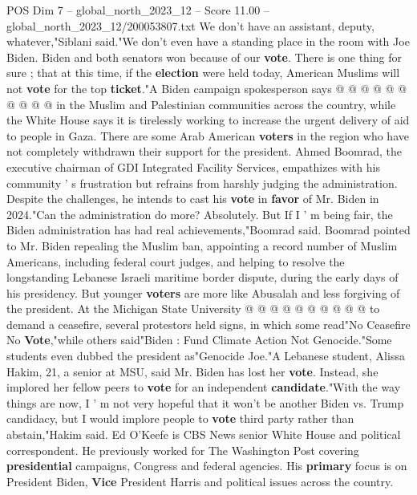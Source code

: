 \begin{textsample}{POS Dim 7 – global\_north\_2023\_12 – Score 11.00 – global\_north\_2023\_12/200053807.txt}
We don't have an assistant, deputy, whatever,"Siblani said."We don't even have a standing place in the room with Joe Biden.
Biden and both senators won because of our \textbf{vote}.
There is one thing for sure ; that at this time, if the \textbf{election} were held today, American Muslims will not \textbf{vote} for the top \textbf{ticket}."A Biden campaign spokesperson says @ @ @ @ @ @ @ @ @ @ in the Muslim and Palestinian communities across the country, while the White House says it is tirelessly working to increase the urgent delivery of aid to people in Gaza.
There are some Arab American \textbf{voters} in the region who have not completely withdrawn their support for the president.
Ahmed Boomrad, the executive chairman of GDI Integrated Facility Services, empathizes with his community ' s frustration but refrains from harshly judging the administration.
Despite the challenges, he intends to cast his \textbf{vote} in \textbf{favor} of Mr.
Biden in 2024."Can the administration do more?
Absolutely.
But If I ' m being fair, the Biden administration has had real achievements,"Boomrad said.
Boomrad pointed to Mr.
Biden repealing the Muslim ban, appointing a record number of Muslim Americans, including federal court judges, and helping to resolve the longstanding Lebanese Israeli maritime border dispute, during the early days of his presidency.
But younger \textbf{voters} are more like Abusalah and less forgiving of the president.
At the Michigan State University @ @ @ @ @ @ @ @ @ @ to demand a ceasefire, several protestors held signs, in which some read"No Ceasefire No \textbf{Vote},"while others said"Biden : Fund Climate Action Not Genocide."Some students even dubbed the president as"Genocide Joe."A Lebanese student, Alissa Hakim, 21, a senior at MSU, said Mr.
Biden has lost her \textbf{vote}.
Instead, she implored her fellow peers to \textbf{vote} for an independent \textbf{candidate}."With the way things are now, I ' m not very hopeful that it won't be another Biden vs.
Trump candidacy, but I would implore people to \textbf{vote} third party rather than abstain,"Hakim said.
Ed O'Keefe is CBS News senior White House and political correspondent.
He previously worked for The Washington Post covering \textbf{presidential} campaigns, Congress and federal agencies.
His \textbf{primary} focus is on President Biden, \textbf{Vice} President Harris and political issues across the country.

\end{textsample}
